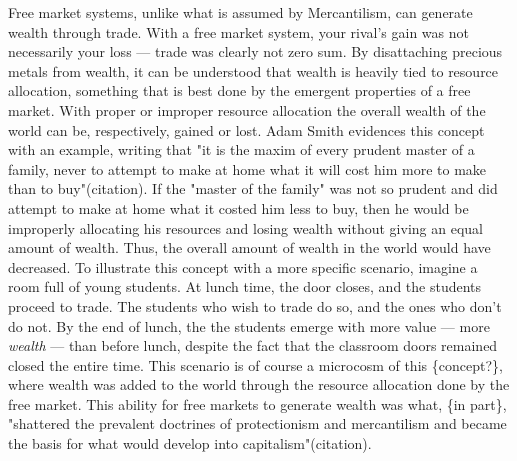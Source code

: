 \documentclass[letterpaper]{article}
\begin{document}
Free market systems, unlike what is assumed by Mercantilism, can
generate wealth through trade. With a free market system, your rival's
gain was not necessarily your loss --- trade was clearly not zero sum.
By disattaching precious metals from wealth, it can be understood that
wealth is heavily tied to resource allocation, something that is best
done by the emergent properties of a free market. With proper or
improper resource allocation the overall wealth of the world can be,
respectively, gained or lost. Adam Smith evidences this concept with an
example, writing that "it is the maxim of every prudent master of a
family, never to attempt to make at home what it will cost him more to
make than to buy"(citation). If the "master of the family" was not so
prudent and did attempt to make at home what it costed him less to buy,
then he would be improperly allocating his resources and losing wealth
without giving an equal amount of wealth. Thus, the overall amount of
wealth in the world would have decreased. To illustrate this concept
with a more specific scenario, imagine a room full of young students. At
lunch time, the door closes, and the students proceed to trade. The
students who wish to trade do so, and the ones who don't do not. By the
end of lunch, the the students emerge with more value --- more \emph{wealth}
--- than before lunch, despite the fact that the classroom doors
remained closed the entire time. This scenario is of course a microcosm
of this \{concept?\}, where wealth was added to the world through the
resource allocation done by the free market. This ability for free
markets to generate wealth was what, \{in part\}, "shattered the prevalent
doctrines of protectionism and mercantilism and became the basis for
what would develop into capitalism"(citation).
\end{document}
